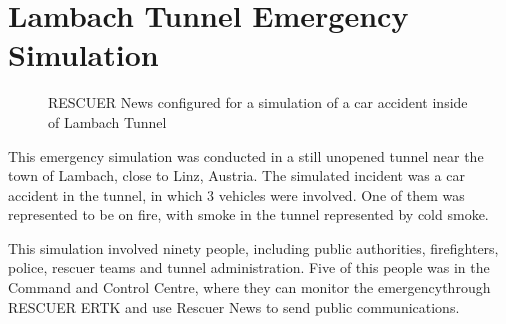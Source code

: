 \section{Lambach Tunnel Emergency Simulation}

\begin{figure}[!ht]
\centering
{}
\quad %
\caption{RESCUER News configured for a simulation of a car accident inside of Lambach Tunnel}
\label{demoLambach}
\end{figure}

This emergency simulation was conducted in a still unopened tunnel near the town of Lambach,
close to Linz, Austria. The simulated incident was a car accident in the tunnel, in which 3 vehicles were involved. One of them was represented to be on fire, with smoke in the tunnel represented by cold smoke.

This simulation involved ninety people, including public authorities, firefighters, police, rescuer teams and tunnel administration. Five of this people was in the Command and Control Centre, where they can monitor the emergencythrough RESCUER ERTK and use Rescuer News to send public communications.

